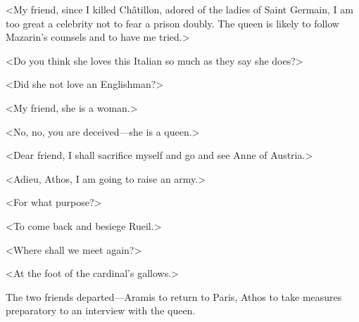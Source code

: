 <My friend, since I killed Châtillon, adored of the ladies of Saint Germain, I am too great a celebrity not to fear a prison doubly. The queen is likely to follow Mazarin's counsels and to have me tried.>

<Do you think she loves this Italian so much as they say she does?>

<Did she not love an Englishman?>

<My friend, she is a woman.>

<No, no, you are deceived—she is a queen.>

<Dear friend, I shall sacrifice myself and go and see Anne of Austria.>

<Adieu, Athos, I am going to raise an army.>

<For what purpose?>

<To come back and besiege Rueil.>

<Where shall we meet again?>

<At the foot of the cardinal's gallows.>

The two friends departed—Aramis to return to Paris, Athos to take measures preparatory to an interview with the queen. 